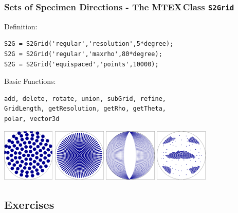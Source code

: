 \documentclass{beamer}
\newcommand{\MTEX}{{\bf {\color{red}M}TEX\,}}%
\begin{document}
\begin{frame}[fragile]
  \frametitle{Sets of Specimen Directions - The \MTEX Class \texttt{\bf S2Grid}}
  
Definition:

\begin{lstlisting}
S2G = S2Grid('regular','resolution',5*degree);
S2G = S2Grid('regular','maxrho',80*degree);
S2G = S2Grid('equispaced','points',10000);     
\end{lstlisting}

\medskip

Basic Functions:

\begin{lstlisting}
add, delete, rotate, union, subGrid, refine,
GridLength, getResolution, getRho, getTheta, 
polar, vector3d
\end{lstlisting}

\begin{center}
  \includegraphics[width=2.5cm]{pic/S2Grid1} \quad
  \includegraphics[width=2.5cm]{pic/S2Grid2} \quad
  \includegraphics[width=2.5cm]{pic/S2Grid3} \quad
  \includegraphics[width=2.5cm]{pic/S2Grid4}
\end{center}

\end{frame}


\subsection*{Exercises}
\end{document}
